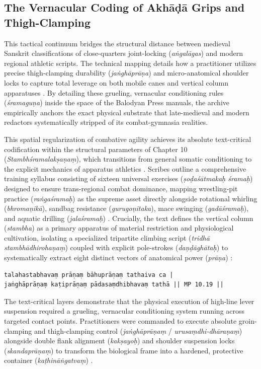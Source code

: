 \documentclass[11pt,twoside,letterpaper]{article}
\begin{document}
\subsection{The Vernacular Coding of Akhāḍā Grips and Thigh-Clamping}
This tactical continuum bridges the structural distance between medieval Sanskrit classifications of close-quarters joint-locking (\textit{aṅgalāgas}) and modern regional athletic scripts. The technical mapping details how a practitioner utilizes precise thigh-clamping durability (\textit{jaṅghāprāṇa}) and micro-anatomical shoulder locks to capture total leverage on both mobile canes and vertical column apparatuses \citep{Khasgivale1929}. By detailing these grueling, vernacular conditioning rules (\textit{śramaguṇa}) inside the space of the Balodyan Press manuals, the archive empirically anchors the exact physical substrate that late-medieval and modern redactors systematically stripped of its combat-gymnasia realities.

This spatial regularization of combative agility achieves its absolute text-critical codification within the structural parameters of Chapter 10 (\textit{Stambhśramalakṣaṇaṃ}), which transitions from general somatic conditioning to the explicit mechanics of apparatus athletics \citep{MP_7}. Scribes outline a comprehensive training syllabus consisting of sixteen universal exercises (\textit{ṣoḍaśātmakaḥ śramaḥ}) designed to ensure trans-regional combat dominance, mapping wrestling-pit practice (\textit{raṅgaśramaḥ}) as the supreme asset directly alongside rotational whirling (\textit{bhromaṇikā}), sandbag resistance (\textit{gurugoṇitaka}), mace swinging (\textit{gadāśramaḥ}), and aquatic drilling (\textit{jalaśramaḥ}) \citep{MP_7}. Crucially, the text defines the vertical column (\textit{stambha}) as a primary apparatus of material restriction and physiological cultivation, isolating a specialized tripartite climbing script (\textit{tridhā stambhādhirohaṇaṃ}) coupled with explicit pole-strokes (\textit{daṇḍāghātaḥ}) to systematically extract eight distinct vectors of anatomical power (\textit{prāṇa}) \citep{MP_7}:
\begin{lstlisting}[language=Sanskrit, caption={Mallapurāṇa Core Apparatus Power and Exercise Recension}]
talahastabhavaṃ prāṇaṃ bāhuprāṇaṃ tathaiva ca |
jaṅghāprāṇaṃ kaṭiprāṇaṃ pādasaṃdhibhavaṃ tathā || MP 10.19 ||
\end{lstlisting}

The text-critical layers demonstrate that the physical execution of high-line lever suspension required a grueling, vernacular conditioning system running across targeted contact points. Practitioners were commanded to execute absolute groin-clamping and thigh-clamping control (\textit{jaṅghāprāṇaṃ} / \textit{urusaṃdhi-dhāraṇaṃ}) alongside double flank alignment (\textit{kakṣayoḥ}) and shoulder suspension locks (\textit{skandaprāṇaṃ}) to transform the biological frame into a hardened, protective container (\textit{kaṭhināṅgatvaṃ}) \citep{MP_7}. 
\end{document}
